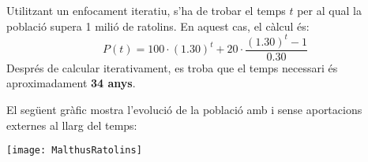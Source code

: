 Utilitzant un enfocament iteratiu, s'ha de trobar el temps \( t \) per al qual la població supera 1 milió de ratolins. En aquest cas, el càlcul és:
\[
P(t) = 100 \cdot (1.30)^t + 20 \cdot \frac{(1.30)^t - 1}{0.30}
\]
Després de calcular iterativament, es troba que el temps necessari és aproximadament \textbf{34 anys}.


El següent gràfic mostra l'evolució de la població amb i sense aportacions externes al llarg del temps:

\begin{minipage}[t]{\linewidth}
  \vspace{-2ex}
  \texttt{[image: MalthusRatolins]}
  \label{fig:MalthusRatolins}
\end{minipage}


\blacksquare 